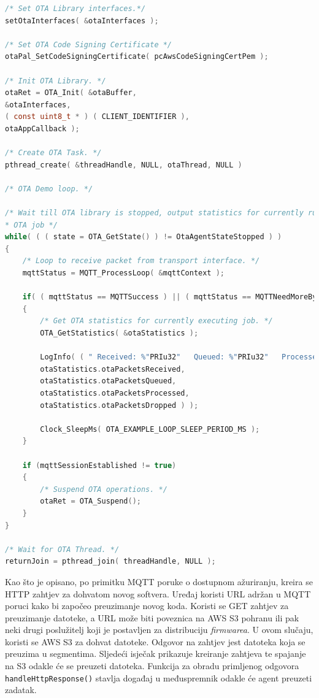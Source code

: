 \begin{lstlisting}[caption={Rad OTA agenta}, language=c]
/* Set OTA Library interfaces.*/
setOtaInterfaces( &otaInterfaces );

/* Set OTA Code Signing Certificate */
otaPal_SetCodeSigningCertificate( pcAwsCodeSigningCertPem );

/* Init OTA Library. */
otaRet = OTA_Init( &otaBuffer,
&otaInterfaces,
( const uint8_t * ) ( CLIENT_IDENTIFIER ),
otaAppCallback );

/* Create OTA Task. */
pthread_create( &threadHandle, NULL, otaThread, NULL )

/* OTA Demo loop. */

/* Wait till OTA library is stopped, output statistics for currently running
* OTA job */
while( ( ( state = OTA_GetState() ) != OtaAgentStateStopped ) )
{
	/* Loop to receive packet from transport interface. */
	mqttStatus = MQTT_ProcessLoop( &mqttContext );
	
	if( ( mqttStatus == MQTTSuccess ) || ( mqttStatus == MQTTNeedMoreBytes ) )
	{
		/* Get OTA statistics for currently executing job. */
		OTA_GetStatistics( &otaStatistics );
		
		LogInfo( ( " Received: %"PRIu32"   Queued: %"PRIu32"   Processed: %"PRIu32"   Dropped: %"PRIu32"",
		otaStatistics.otaPacketsReceived,
		otaStatistics.otaPacketsQueued,
		otaStatistics.otaPacketsProcessed,
		otaStatistics.otaPacketsDropped ) );
		
		Clock_SleepMs( OTA_EXAMPLE_LOOP_SLEEP_PERIOD_MS );
	}
	
	if (mqttSessionEstablished != true)
	{
		/* Suspend OTA operations. */
		otaRet = OTA_Suspend();
	}
}

/* Wait for OTA Thread. */
returnJoin = pthread_join( threadHandle, NULL );
\end{lstlisting}

Kao što je opisano, po primitku MQTT poruke o dostupnom ažuriranju, kreira se HTTP zahtjev za dohvatom novog softvera. Uređaj koristi URL adržan u MQTT poruci kako bi započeo preuzimanje novog koda. Koristi se GET zahtjev za preuzimanje datoteke, a URL može biti poveznica na AWS S3 pohranu ili pak neki drugi poslužitelj koji je postavljen za distribuciju \textit{firmwarea}. U ovom slučaju, koristi se AWS S3 za dohvat datoteke. Odgovor na zahtjev jest datoteka koja se preuzima u segmentima. Sljedeći isječak prikazuje kreiranje zahtjeva te spajanje na S3 odakle će se preuzeti datoteka. Funkcija za obradu primljenog odgovora \lstinline|handleHttpResponse()| stavlja događaj u međuspremnik odakle će agent preuzeti zadatak. 

